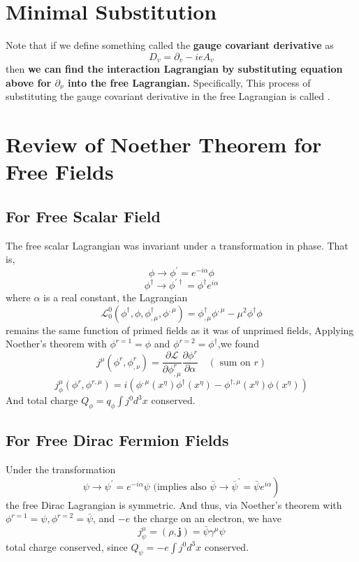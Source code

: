\section{Minimal Substitution}
Note that if we define something called the \textbf{gauge covariant derivative} as
\begin{equation}
D_{v}=\partial_{v}-i e A_{v}
\end{equation}
then \textbf{we can find the interaction Lagrangian by substituting equation above for $\partial_{\nu}$ into the free Lagrangian.} Specifically, This process of substituting the gauge covariant derivative in the free Lagrangian is called .

\section{Review of Noether Theorem for Free Fields}
\subsection{For Free Scalar Field}
The free scalar Lagrangian was invariant under a transformation in phase. That is, 
$$
\phi \rightarrow \phi^{\prime}=e^{-i \alpha} \phi
$$
$$
\phi^{\dagger} \rightarrow \phi^{\prime \dagger}=\phi^{\dagger} e^{i \alpha}
$$
where $\alpha$ is a real constant, the Lagrangian
$$
\mathcal{L}_{0}^{0}\left(\phi^{\dagger}, \phi, \phi^{\dagger}_{,\mu}, \phi^{,\mu}\right)=\phi^{\dagger}_{, \mu} \phi^{,\mu}-\mu^{2} \phi^{\dagger} \phi
$$
remains the same function of primed fields as it was of unprimed fields, Applying Noether's theorem with $\phi^{r=1}=\phi$ and $\phi^{r=2}=\phi^{\dagger}$,we found
$$
j^{\mu}\left(\phi^{r}, \phi^{r}_{, \nu}\right)=\frac{\partial \mathcal{L}}{\partial \phi^{r}_{, \mu}} \frac{\partial \phi^{r}}{\partial \alpha} \quad(\text { sum on } r)
$$
$$
j_{\phi}^{\mu}\left(\phi^{r}, \phi^{r, \mu}\right)=i\left(\phi^{,\mu}\left(x^{\eta}\right) \phi^{\dagger}\left(x^{\eta}\right)-\phi^{\dagger, \mu}\left(x^{\eta}\right) \phi\left(x^{\eta}\right)\right)
$$
And total charge $Q_{\phi}=q_{\phi} \int j^{0} d^{3} x$ conserved.

\subsection{For Free Dirac Fermion Fields}
Under the transformation
$$
\left.\psi \rightarrow \psi^{\prime}=e^{-i \alpha} \psi \text { (implies also } \bar{\psi} \rightarrow \bar{\psi}^{\prime}=\bar{\psi} e^{i \alpha}\right)
$$
the free Dirac Lagrangian is symmetric. And thus, via Noether's theorem with $\phi^{r=1}=\psi, \phi^{r=2}=\bar{\psi}$, and $-e$ the charge on an electron, we have
$$
j_{\psi}^{\mu}=(\rho, \mathbf{j})=\bar{\psi} \gamma^{\mu} \psi
$$
total charge conserved, since $Q_{\psi}=-e \int j^{0} d^{3} x$ conserved.

